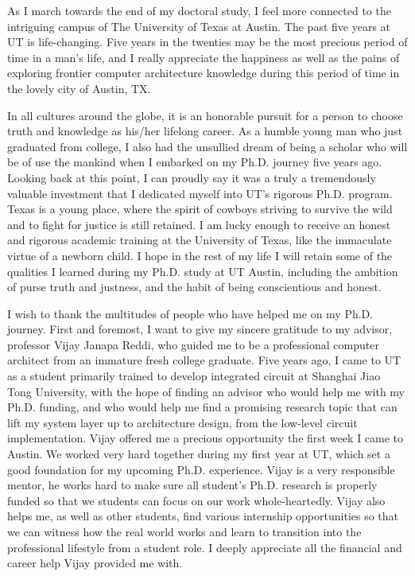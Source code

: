 
\begin{acknowledgments}		%

As I march towards the end of my doctoral study, I feel more connected to the intriguing campus of The University of Texas at Austin. The past five years at UT is life-changing. Five years in the twenties may be the most precious period of time in a man's life, and I really appreciate the happiness as well as the pains of exploring frontier computer architecture knowledge during this period of time in the lovely city of Austin, TX.

In all cultures around the globe, it is an honorable pursuit for a person to choose truth and knowledge as his/her lifelong career. As a humble young man who just graduated from college, I also had the unsullied dream of being a scholar who will be of use the mankind when I embarked on my Ph.D. journey five years ago. Looking back at this point, I can proudly say it was a truly a tremendously valuable investment that I dedicated myself into UT's rigorous Ph.D. program. Texas is a young place, where the spirit of cowboys striving to survive the wild and to fight for justice is still retained. I am lucky enough to receive an honest and rigorous academic training at the University of Texas, like the immaculate virtue of a newborn child. I hope in the rest of my life I will retain some of the qualities I learned during my Ph.D. study at UT Austin, including the ambition of purse truth and justness, and the habit of being conscientious and honest.  

I wish to thank the multitudes of people who have helped me on my Ph.D. journey. First and foremost, I want to give my sincere gratitude to my advisor, professor Vijay Janapa Reddi, who guided me to be a professional computer architect from an immature fresh college graduate. Five years ago, I came to UT as a student primarily trained to develop integrated circuit at Shanghai Jiao Tong University, with the hope of finding an advisor who would help me with my Ph.D. funding, and who would help me find a promising research topic that can lift my system layer up to architecture design, from the low-level circuit implementation. Vijay offered me a precious opportunity the first week I came to Austin. We worked very hard together during my first year at UT, which set a good foundation for my upcoming Ph.D. experience. Vijay is a very responsible mentor, he works hard to make sure all student's Ph.D. research is properly funded so that we students can focus on our work whole-heartedly. Vijay also helps me, as well as other students, find various internship opportunities so that we can witness how the real world works and learn to transition into the professional lifestyle from a student role. I deeply appreciate all the financial and career help Vijay provided me with.


\end{acknowledgments}
